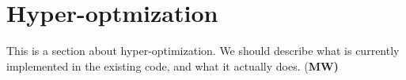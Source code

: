 \section{Hyper-optmization}
\label{sec:hyper-opt}

This is a section about hyper-optimization. We should describe what is currently
implemented in the existing code, and what it actually does. {(\bf MW)}